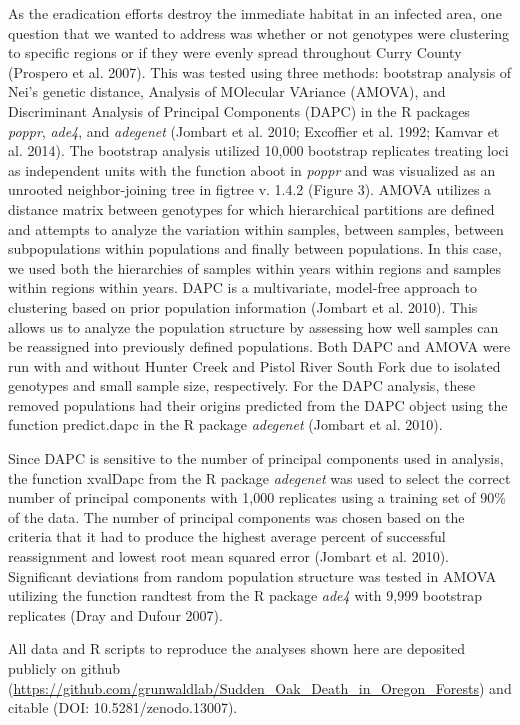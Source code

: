 \documentclass[double,12pt]{beavtex}
\begin{document}
  As the eradication efforts destroy the immediate habitat in an infected
  area, one question that we wanted to address was whether or not
  genotypes were clustering to specific regions or if they were evenly
  spread throughout Curry County (Prospero et al. 2007). This was tested
  using three methods: bootstrap analysis of Nei's genetic distance,
  Analysis of MOlecular VAriance (AMOVA), and Discriminant Analysis of
  Principal Components (DAPC) in the R packages \emph{poppr}, \emph{ade4},
  and \emph{adegenet} (Jombart et al. 2010; Excoffier et al. 1992; Kamvar
  et al. 2014). The bootstrap analysis utilized 10,000 bootstrap
  replicates treating loci as independent units with the function aboot in
  \emph{poppr} and was visualized as an unrooted neighbor-joining tree in
  figtree v. 1.4.2 (Figure 3). AMOVA utilizes a distance matrix between
  genotypes for which hierarchical partitions are defined and attempts to
  analyze the variation within samples, between samples, between
  subpopulations within populations and finally between populations. In
  this case, we used both the hierarchies of samples within years within
  regions and samples within regions within years. DAPC is a multivariate,
  model-free approach to clustering based on prior population information
  (Jombart et al. 2010). This allows us to analyze the population
  structure by assessing how well samples can be reassigned into
  previously defined populations. Both DAPC and AMOVA were run with and
  without Hunter Creek and Pistol River South Fork due to isolated
  genotypes and small sample size, respectively. For the DAPC analysis,
  these removed populations had their origins predicted from the DAPC
  object using the function predict.dapc in the R package \emph{adegenet}
  (Jombart et al. 2010).
  
  Since DAPC is sensitive to the number of principal components used in
  analysis, the function xvalDapc from the R package \emph{adegenet} was
  used to select the correct number of principal components with 1,000
  replicates using a training set of 90\% of the data. The number of
  principal components was chosen based on the criteria that it had to
  produce the highest average percent of successful reassignment and
  lowest root mean squared error (Jombart et al. 2010). Significant
  deviations from random population structure was tested in AMOVA
  utilizing the function randtest from the R package \emph{ade4} with
  9,999 bootstrap replicates (Dray and Dufour 2007).
  
  All data and R scripts to reproduce the analyses shown here are
  deposited publicly on github
  (\url{https://github.com/grunwaldlab/Sudden_Oak_Death_in_Oregon_Forests})
  and citable (DOI: 10.5281/zenodo.13007).
  
\end{document}
